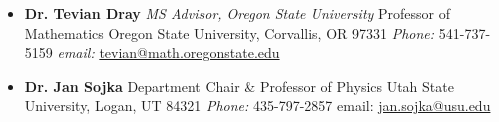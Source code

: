 \documentclass[11pt,letterpaper,sans,unicode]{moderncv}
\begin{document}
\begin{itemize}[leftmargin=8mm]
	\item \textbf{Dr. Tevian Dray} \emph{MS Advisor, Oregon State University}
     		\newline Professor of Mathematics
		\newline Oregon State University, Corvallis, OR 97331
		\newline \emph{Phone:} 	541-737-5159 \qquad \emph{email:} \url{tevian@math.oregonstate.edu}
		\newline
	\item \textbf{Dr. Jan Sojka}
        		\newline Department Chair \& Professor of Physics
		\newline Utah State University, Logan, UT 84321
		\newline \emph{Phone:} 435-797-2857 \qquad email: \url{jan.sojka@usu.edu}
		\newline
	\begin{comment}
	\item \textbf{Dr. Damon T. Spayde} %
       		\newline Department Chair \& Associate Professor of Physics
		\newline Hendrix College, Conway, AR 72032
		\newline \emph{Phone:} 501-450-1251 \qquad email:\url{spayde@hendrix.edu}
		\newline
	\item \textbf{Dr. Shane Larson} \emph{Collaborator}
        		\newline Research Associate Professor
		\newline Center for Interdisciplinary Exploration and Research in Astrophysics (CIERA)
		\newline Northwestern University, Evanston, IL 60208
		\newline \emph{Phone:} 847-467-4305 \qquad \emph{email:}\url{s.larson@northwestern.edu}
		\newline
	\item \textbf{Dr. Todd Tinsley} %
       		\newline Associate Professor of Physics
		\newline Hendrix College, Conway, AR 72032
		\newline \emph{Phone:} 501-450-1404 \qquad email:\url{tinsley@hendrix.edu}
		\newline
	\end{comment}
	\end{itemize}
\end{document}

